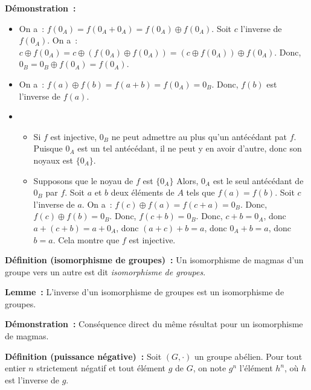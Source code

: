 \medskip

\noindent\textbf{Démonstration :}
    \begin{itemize}[nosep]
        \item On a : $f(0_A) = f(0_A + 0_A) = f(0_A) \oplus f(0_A)$. 
            Soit $c$ l'inverse de $f(0_A)$.
            On a : $c \oplus f(0_A) = c \oplus (f(0_A) \oplus f(0_A)) = (c \oplus f(0_A)) \oplus f(0_A)$.
            Donc, $0_B = 0_B \oplus f(0_A) = f(0_A)$.
        \item On a : $f(a) \oplus f(b) = f(a + b) = f(0_A) = 0_B$.
            Donc, $f(b)$ est l'inverse de $f(a)$.
        \item 
            \begin{itemize}[nosep]
                \item Si $f$ est injective, $0_B$ ne peut admettre au plus qu'un antécédant pat $f$. 
                    Puisque $0_A$ est un tel antécédant, il ne peut y en avoir d'autre, donc son noyaux est $\lbrace 0_A \rbrace$.
                \item Supposons que le noyau de $f$ est $\lbrace 0_A \rbrace$
                    Alors, $0_A$ est le seul antécédant de $0_B$ par $f$.
                    Soit $a$ et $b$ deux éléments de $A$ tels que $f(a) = f(b)$. 
                    Soit $c$ l'inverse de $a$.
                    On a : $f(c) \oplus f(a) = f(c + a) = 0_B$.
                    Donc, $f(c) \oplus f(b) = 0_B$.
                    Donc, $f(c + b) = 0_B$.
                    Donc, $c + b = 0_A$, donc $a + (c + b) = a + 0_A$, donc $(a + c) + b = a$, donc $0_A + b = a$, donc $b = a$.
                    Cela montre que $f$ est injective.
            \end{itemize}
    \end{itemize}

    \done

\medskip

\noindent\textbf{Définition (isomorphisme de groupes) :} Un isomorphisme de magmas d'un groupe vers un autre est dit \textit{isomorphisme de groupes}.

\medskip

\noindent\textbf{Lemme :} L'inverse d'un isomorphisme de groupes est un isomorphisme de groupes.

\medskip

\noindent\textbf{Démonstration :} Conséquence direct du même résultat pour un isomorphisme de magmas.

\medskip

\noindent\textbf{Définition (puissance négative) :} Soit $(G,\cdot)$ un groupe abélien. 
    Pour tout entier $n$ strictement négatif et tout élément $g$ de $G$, on note $g^n$ l'élément $h^n$, où $h$ est l'inverse de $g$.

